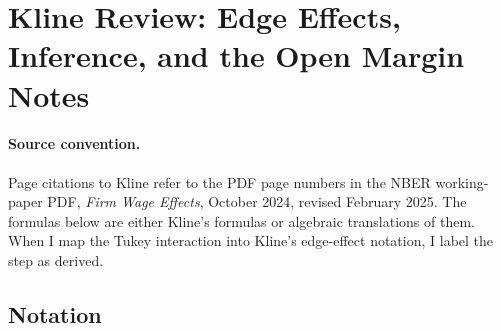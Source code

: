\documentclass[11pt]{article}
\begin{document}
\section{Kline Review: Edge Effects, Inference, and the Open Margin Notes}

\paragraph{Source convention.}
Page citations to Kline refer to the PDF page numbers in the NBER working-paper
PDF, \emph{Firm Wage Effects}, October 2024, revised February 2025. The formulas
below are either Kline's formulas or algebraic translations of them. When I map the
Tukey interaction into Kline's edge-effect notation, I label the step as derived.

\subsection{Notation}
\end{document}
